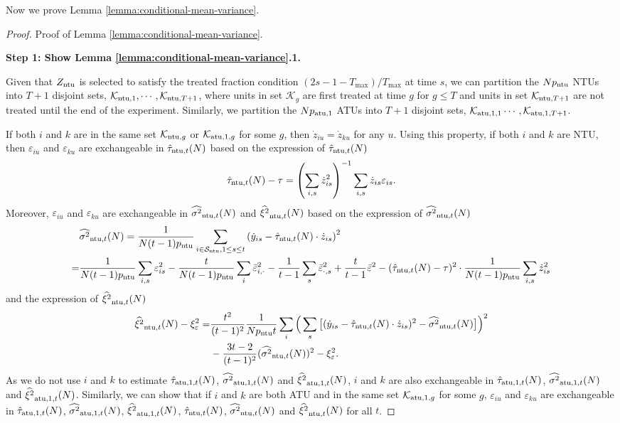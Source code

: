 Now we prove Lemma \ref{lemma:conditional-mean-variance}.


\begin{proof}{Proof of Lemma \ref{lemma:conditional-mean-variance}.}

\textbf{Step 1: Show Lemma \ref{lemma:conditional-mean-variance}.1.}


Given that  $Z_{\mathrm{ntu}}$ is selected to satisfy the treated fraction condition $(2s-1-T_{\max})/T_{\max}$ at time $s$, we can partition the  $Np_{\mathrm{ntu}}$ NTUs into $T+1$ disjoint sets, $\mathcal{K}_{\mathrm{ntu},1}, \cdots, \mathcal{K}_{\mathrm{ntu},T+1}$, where units in set $\mathcal{K}_g$ are first treated at time $g$ for $g \leq T$ and units in set $\mathcal{K}_{\mathrm{ntu},T+1}$ are not treated until the end of the experiment. Similarly, we partition the $Np_{\mathrm{atu},1}$ ATUs into $T+1$ disjoint sets, $\mathcal{K}_{\mathrm{atu},1,1} \cdots, \mathcal{K}_{\mathrm{atu},1,T+1}$. 

If both $i$ and $k$ are in the same set $\mathcal{K}_{\mathrm{ntu},g}$ or $\mathcal{K}_{\mathrm{atu},1,g}$ for some $g$, then $\dot{z}_{iu} = \dot{z}_{ku}$ for any $u$. 
%
Using this property, if both $i$ and $k$ are NTU, then $\varepsilon_{iu}$ and $\varepsilon_{ku}$ are exchangeable in $\hat{\tau}_{\mathrm{ntu},t}(N) $ based on the expression of $\hat{\tau}_{\mathrm{ntu},t}(N) $
\[ \hat{\tau}_{\mathrm{ntu},t}(N) - \tau = \left( \sum_{i,s} \dot{z}_{is}^2 \right)^{-1} \sum_{i,s} \dot{z}_{is} \varepsilon_{is}. \]
Moreover, $\varepsilon_{iu}$ and $\varepsilon_{ku}$ are exchangeable in $\widehat{\sigma^2}_{\mathrm{ntu},t}(N)$ and $\widehat{\xi^2}_{\mathrm{ntu},t}(N)$ based on the expression of $\widehat{\sigma^2}_{\mathrm{ntu},t}(N)$ 
\begin{align*}
    &\widehat{\sigma^2}_{\mathrm{ntu},t}(N) = \frac{1}{N(t-1) p_{\mathrm{ntu}}} \sum_{i \in \mathcal{S}_{\mathrm{ntu}}, 1 \leq s \leq t} \left(\dot{y}_{is} - \hat{\tau}_{\mathrm{ntu},t}(N) \cdot \dot{z}_{is} \right)^2 \\
 =& \frac{1}{N(t-1) p_{\mathrm{ntu}}} \sum_{i,s} \varepsilon_{is}^2 - \frac{t}{N(t-1) p_{\mathrm{ntu}}} \sum_i \bar{\varepsilon}^2_{i,\cdot}  - \frac{1}{t-1} \sum_s \bar{\varepsilon}^2_{\cdot,s}  + \frac{t}{t-1} \bar{\varepsilon}^2 - (\hat{\tau}_{\mathrm{ntu},t}(N) - \tau)^2 \cdot \frac{1}{N(t-1) p_{\mathrm{ntu}}} \sum_{i,s} \dot{z}_{is}^2  
\end{align*}
and the expression of $\widehat{\xi^2}_{\mathrm{ntu},t}(N)$
\begin{align*}
    \widehat{\xi^2}_{\mathrm{ntu},t}(N) - \xi^2_\varepsilon =&  \frac{t^2}{(t - 1)^2}\frac{1}{N p_{\mathrm{ntu}} t}  \sum_i \Big(\sum_{s} \big[ (\dot{y}_{is} - \hat{\tau}_{\mathrm{ntu},t}(N) \cdot \dot{z}_{is})^2 - \widehat{\sigma^2}_{\mathrm{ntu},t}(N) \big] \Big)^2 \\ & - \frac{3t-2}{(t-1)^2} (\widehat{\sigma^2}_{\mathrm{ntu},t}(N))^2 - \xi^2_\varepsilon. 
\end{align*}
As we do not use $i$ and $k$ to estimate $\hat{\tau}_{\mathrm{atu},1,t}(N)$, $\widehat{\sigma^2}_{\mathrm{atu},1,t}(N)$ and $\widehat{\xi^2}_{\mathrm{atu},1,t}(N)$, $i$ and $k$ are also exchangeable in $\hat{\tau}_{\mathrm{atu},1,t}(N)$, $\widehat{\sigma^2}_{\mathrm{atu},1,t}(N)$ and $\widehat{\xi^2}_{\mathrm{atu},1,t}(N)$. Similarly, we can show that if $i$ and $k$ are both ATU and in the same set $\mathcal{K}_{\mathrm{atu},1,g}$ for some $g$, $\varepsilon_{iu}$ and $\varepsilon_{ku}$ are exchangeable in $\hat{\tau}_{\mathrm{atu},1,t}(N)$, $\widehat{\sigma^2}_{\mathrm{atu},1,t}(N)$, $\widehat{\xi^2}_{\mathrm{atu},1,t}(N)$, $\hat{\tau}_{\mathrm{ntu},t}(N)$, $\widehat{\sigma^2}_{\mathrm{ntu},t}(N)$ and $\widehat{\xi^2}_{\mathrm{ntu},t}(N)$ for all $t$. 



\end{proof}
